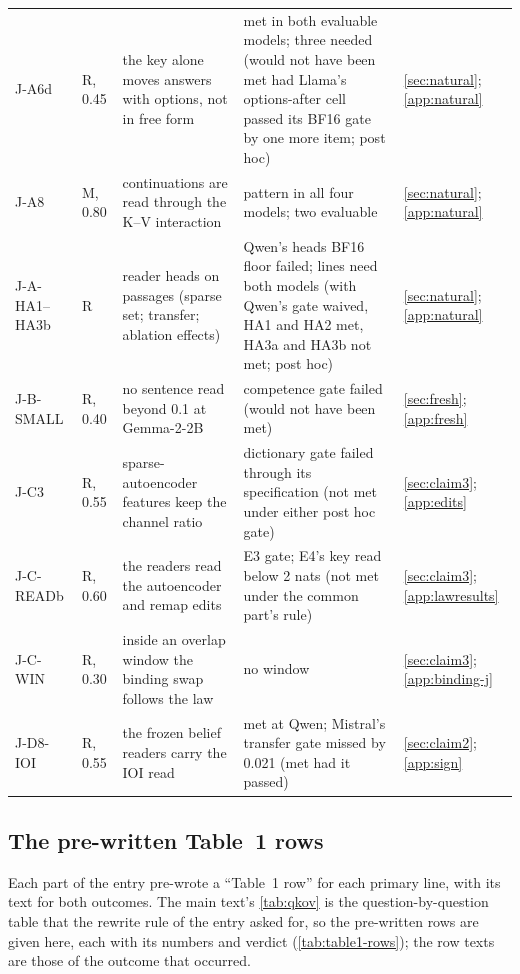 \begin{table}[p]
\begin{tabular}{@{}p{}p{}p{}p{}p{}@{}}
J-A6d & R, 0.45 & the key alone moves answers with options, not in free form & met in both evaluable models; three needed (would not have been met had Llama's options-after cell passed its BF16 gate by one more item; post hoc) & \cref{sec:natural}; \cref{app:natural} \\
J-A8 & M, 0.80 & continuations are read through the K--V interaction & pattern in all four models; two evaluable & \cref{sec:natural}; \cref{app:natural} \\
J-A-HA1--HA3b & R & reader heads on passages (sparse set; transfer; ablation effects) & Qwen's heads BF16 floor failed; lines need both models (with Qwen's gate waived, HA1 and HA2 met, HA3a and HA3b not met; post hoc) & \cref{sec:natural}; \cref{app:natural} \\
J-B-SMALL & R, 0.40 & no sentence read beyond 0.1 at Gemma-2-2B & competence gate failed (would not have been met) & \cref{sec:fresh}; \cref{app:fresh} \\
J-C3 & R, 0.55 & sparse-autoencoder features keep the channel ratio & dictionary gate failed through its specification (not met under either post hoc gate) & \cref{sec:claim3}; \cref{app:edits} \\
J-C-READb & R, 0.60 & the readers read the autoencoder and remap edits & E3 gate; E4's key read below 2 nats (not met under the common part's rule) & \cref{sec:claim3}; \cref{app:lawresults} \\
J-C-WIN & R, 0.30 & inside an overlap window the binding swap follows the law & no window & \cref{sec:claim3}; \cref{app:binding-j} \\
J-D8-IOI & R, 0.55 & the frozen belief readers carry the IOI read & met at Qwen; Mistral's transfer gate missed by 0.021 (met had it passed) & \cref{sec:claim2}; \cref{app:sign} \\
\bottomrule
\end{tabular}
\end{table}

\subsection{The pre-written Table~1 rows}\label{app:table1-rows}

Each part of the entry pre-wrote a ``Table~1 row'' for each primary line, with its text for both outcomes. The main text's \cref{tab:qkov} is the question-by-question table that the rewrite rule of the entry asked for, so the pre-written rows are given here, each with its numbers and verdict (\cref{tab:table1-rows}); the row texts are those of the outcome that occurred.

